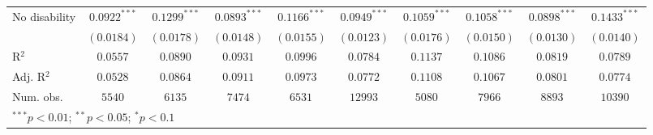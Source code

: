 \documentclass{article}
\begin{document}
\begin{table}
\begin{adjustbox}{width=1\textwidth}
\begin{tabular}{l c c c c c c c c c}
No disability                  & $0.0922^{***}$  & $0.1299^{***}$  & $0.0893^{***}$  & $0.1166^{***}$  & $0.0949^{***}$  & $0.1059^{***}$  & $0.1058^{***}$  & $0.0898^{***}$  & $0.1433^{***}$  \\
                               & $(0.0184)$      & $(0.0178)$      & $(0.0148)$      & $(0.0155)$      & $(0.0123)$      & $(0.0176)$      & $(0.0150)$      & $(0.0130)$      & $(0.0140)$      \\
\hline
R$^2$                          & $0.0557$        & $0.0890$        & $0.0931$        & $0.0996$        & $0.0784$        & $0.1137$        & $0.1086$        & $0.0819$        & $0.0789$        \\
Adj. R$^2$                     & $0.0528$        & $0.0864$        & $0.0911$        & $0.0973$        & $0.0772$        & $0.1108$        & $0.1067$        & $0.0801$        & $0.0774$        \\
Num. obs.                      & $5540$          & $6135$          & $7474$          & $6531$          & $12993$         & $5080$          & $7966$          & $8893$          & $10390$         \\
\hline
\multicolumn{10}{l}{\scriptsize{$^{***}p<0.01$; $^{**}p<0.05$; $^{*}p<0.1$}}
\end{tabular}
\label{table:coefficients}
\end{adjustbox}
\end{table}
\end{document}
